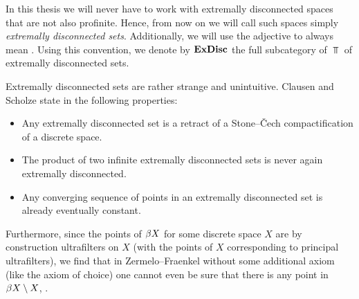 \begin{convention}
	In this thesis we will never have to work with extremally disconnected spaces that are not also profinite. Hence, from now on we will call such spaces simply \emph{extremally disconnected sets}. Additionally, we will use the adjective  to always mean . Using this convention, we denote by ${\mathbf{ExDisc}}$ the full subcategory of $\Top$ of extremally disconnected sets.
\end{convention}

\begin{remark}
	Extremally disconnected sets are rather strange and unintuitive. Clausen and Scholze state in \cite[Warning 2.6]{condenseddotpdf} the following properties:
	\begin{itemize}
		\item
		Any extremally disconnected set is a retract of a Stone--\v Cech compactification of a discrete space.
		
		\item
		The product of two infinite extremally disconnected sets is never again extremally disconnected.
		
		\item
		Any converging sequence of points in an extremally disconnected set is already eventually constant.
	\end{itemize}
	Furthermore, since the points of ${{\beta} X}$ for some discrete space $X$ are by construction ultrafilters on $X$ (with the points of $X$ corresponding to principal ultrafilters), we find that in Zermelo--Fraenkel without some additional axiom (like the axiom of choice) one cannot even be sure that there is any point in ${{\beta} X} \setminus X$, \confer \cite[\href{https://mathoverflow.net/q/15872/546808}{this MathOverflow post}]{non-principal-ultrafilters}.
\end{remark}

